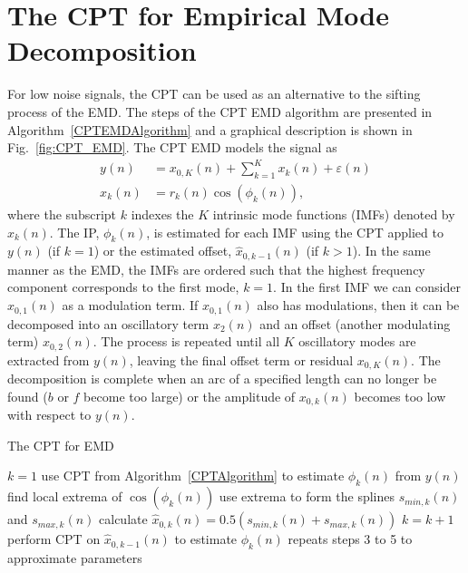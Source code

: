 \documentclass[a4paper]{IEEEtran}
\begin{document}
\section{The CPT for Empirical Mode Decomposition}\label{sect:CPTEMDSection}
For low noise signals, the CPT can be used as an alternative to the sifting process of the EMD. The steps of the CPT EMD algorithm are presented in Algorithm~\ref{CPTEMDAlgorithm} and a graphical description is shown in Fig.~\ref{fig:CPT_EMD}. The CPT EMD models the signal as
\begin{align}
    y(n) &= x_{0,K}(n) + \sum_{k=1}^{K}x_k(n) + \varepsilon(n) \\
    x_k\left(n\right) &= r_k\left(n\right)\cos\left(\phi_k\left(n\right)\right),
\end{align}
where the subscript $k$ indexes the $K$ intrinsic mode functions (IMFs) denoted by $x_k(n)$. The IP, $\phi_k(n)$, is estimated for each IMF using the CPT applied to $y(n)$ (if $k=1$) or the estimated offset, $\hat{x}_{0,k-1}(n)$ (if $k>1$). In the same manner as the EMD, the IMFs are ordered such that the highest frequency component corresponds to the first mode, $k=1$. In the first IMF we can consider $x_{0,1}(n)$ as a modulation term. If $x_{0,1}(n)$ also has modulations, then it can be decomposed into an oscillatory term $x_2(n)$ and an offset (another modulating term) $x_{0,2}(n)$. The process is repeated until all $K$ oscillatory modes are extracted from $y(n)$, leaving the final offset term or residual $x_{0,K}(n)$. The decomposition is complete when an arc of a specified length can no longer be found ($b$ or $f$ become too large) or the amplitude of $x_{0,k}(n)$ becomes too low with respect to $y(n)$.

\begin{algorithm}[ht]
\caption{The CPT for EMD}\label{CPTEMDAlgorithm}
\begin{algorithmic}[1]
\State $k=1$
\State use CPT from Algorithm~\ref{CPTAlgorithm} to estimate $\phi_k(n)$ from $y(n)$
\State find local extrema of $\cos\left(\hat\phi_k(n)\right)$
\State use extrema to form the splines $s_{min,k}(n)$ and $s_{max,k}(n)$
\State calculate $\hat{x}_{0,k}(n) = 0.5\left(s_{min,k}(n) + s_{max,k}(n)\right)$
    \State $k=k+1$
    \State perform CPT on $\hat{x}_{0,k-1}(n)$ to estimate $\phi_{k}(n)$
    \State repeats steps 3 to 5 to approximate parameters
\EndWhile
\end{algorithmic}
\end{algorithm}
\end{document}
